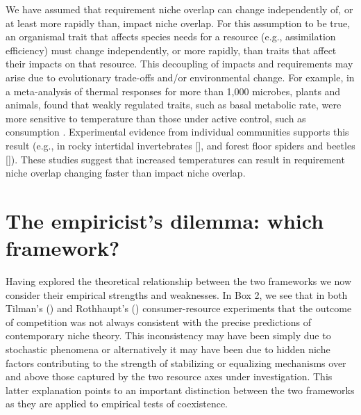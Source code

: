 We have assumed that requirement niche overlap can change independently of, or at least more rapidly than, impact niche overlap. For this assumption to be true, an organismal trait that affects species needs for a resource (e.g., assimilation efficiency) must change independently, or more rapidly, than traits that affect their impacts on that resource. This decoupling of impacts and requirements may arise due to evolutionary trade-offs and/or environmental change. For example, in a meta-analysis of thermal responses for more than 1,000 microbes, plants and animals, \citet{Dell2011} found that weakly regulated traits, such as basal metabolic rate, were more sensitive to temperature than those under active control, such as consumption \citep[see also][]{Lemoine2012}. Experimental evidence from individual communities supports this result (e.g., in rocky intertidal invertebrates [\citealp{Iles2014}], and forest floor spiders and beetles [\citealp{Rall2010, Vucic2011}]). These studies suggest that increased temperatures can result in requirement niche overlap changing faster than impact niche overlap.
\par



\section{The empiricist's dilemma: which framework?}
Having explored the theoretical relationship between the two frameworks we now consider their empirical strengths and weaknesses. In Box 2, we see that in both Tilman's (\citeyear{Tilman1977, tilman1982}) and Rothhaupt's (\citeyear{Rothhaupt1988}) consumer-resource experiments that the outcome of competition was not always consistent with the precise predictions of contemporary niche theory. This inconsistency may have been simply due to stochastic phenomena or alternatively it may have been due to hidden niche factors contributing to the strength of stabilizing or equalizing mechanisms over and above those captured by the two resource axes under investigation. This latter explanation points to an important distinction between the two frameworks as they are applied to empirical tests of coexistence.
\par


